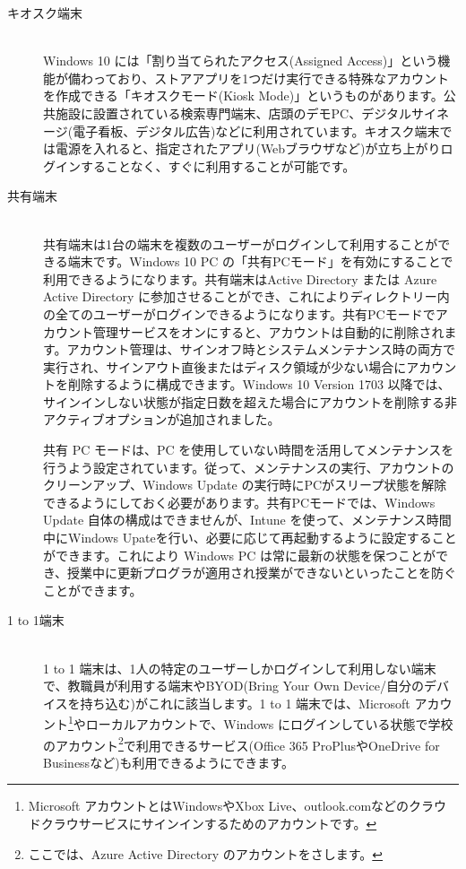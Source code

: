 \begin{description}
    \item[キオスク端末]\mbox{}\\
    Windows 10 には「割り当てられたアクセス(Assigned Access)」という機能が備わっており、ストアアプリを1つだけ実行できる特殊なアカウントを作成できる「キオスクモード(Kiosk Mode)」というものがあります。公共施設に設置されている検索専門端末、店頭のデモPC、デジタルサイネージ(電子看板、デジタル広告)などに利用されています。キオスク端末では電源を入れると、指定されたアプリ(Webブラウザなど)が立ち上がりログインすることなく、すぐに利用することが可能です。
    \item[共有端末] \mbox{}\\
    共有端末は1台の端末を複数のユーザーがログインして利用することができる端末です。Windows 10 PC の「共有PCモード」を有効にすることで利用できるようになります。共有端末はActive Directory または Azure Active Directory に参加させることができ、これによりディレクトリー内の全てのユーザーがログインできるようになります。共有PCモードでアカウント管理サービスをオンにすると、アカウントは自動的に削除されます。アカウント管理は、サインオフ時とシステムメンテナンス時の両方で実行され、サインアウト直後またはディスク領域が少ない場合にアカウントを削除するように構成できます。Windows 10 Version 1703 以降では、サインインしない状態が指定日数を超えた場合にアカウントを削除する非アクティブオプションが追加されました。

    共有 PC モードは、PC を使用していない時間を活用してメンテナンスを行うよう設定されています。従って、メンテナンスの実行、アカウントのクリーンアップ、Windows Update の実行時にPCがスリープ状態を解除できるようにしておく必要があります。共有PCモードでは、Windows Update 自体の構成はできませんが、Intune を使って、メンテナンス時間中にWindows Upateを行い、必要に応じて再起動するように設定することができます。これにより Windows PC は常に最新の状態を保つことができ、授業中に更新プログラが適用され授業ができないといったことを防ぐことができます。
    \item[1 to 1端末] \mbox{}\\
    1 to 1 端末は、1人の特定のユーザーしかログインして利用しない端末で、教職員が利用する端末やBYOD(Bring Your Own Device/自分のデバイスを持ち込む)がこれに該当します。1 to 1 端末では、Microsoft アカウント\footnote{Microsoft アカウントとはWindowsやXbox Live、outlook.comなどのクラウドクラウサービスにサインインするためのアカウントです。}やローカルアカウントで、Windows にログインしている状態で学校のアカウント\footnote{ここでは、Azure Active Directory のアカウントをさします。}で利用できるサービス(Office 365 ProPlusやOneDrive for Businessなど)も利用できるようにできます。
\end{description}

